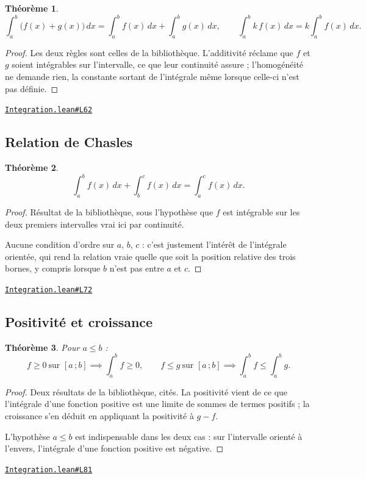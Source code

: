 \documentclass[11pt,a4paper]{article}
\theoremstyle{definition}
\theoremstyle{plain}
\newtheorem{theoreme}{Théorème}
\newcommand{\source}[2]{\par\smallskip\noindent\hfill{\footnotesize\href{#1}{\texttt{#2}}}\par\smallskip}
\begin{document}
\begin{theoreme}
\[ \int_a^b \bigl(f(x) + g(x)\bigr)\,dx = \int_a^b f(x)\,dx + \int_a^b g(x)\,dx ,
   \qquad \int_a^b k\,f(x)\,dx = k \int_a^b f(x)\,dx . \]
\end{theoreme}

\begin{proof}
Les deux règles sont celles de la bibliothèque. L'additivité réclame que $f$ et $g$ soient
intégrables sur l'intervalle, ce que leur continuité assure ; l'homogénéité ne demande
rien, la constante sortant de l'intégrale même lorsque celle-ci n'est pas définie.
\end{proof}
\source{https://github.com/Commutator-IO/learn-lean/blob/main/cours/02-lycee/06-integration/Integration.lean\#L62}{Integration.lean\#L62}

\subsection{Relation de Chasles}

\begin{theoreme}
\[ \int_a^b f(x)\,dx + \int_b^c f(x)\,dx = \int_a^c f(x)\,dx . \]
\end{theoreme}

\begin{proof}
Résultat de la bibliothèque, sous l'hypothèse que $f$ est intégrable sur les deux
premiers intervalles \textemdash{} vrai ici par continuité.

\medskip\noindent
Aucune condition d'ordre sur $a$, $b$, $c$ : c'est justement l'intérêt de l'intégrale
orientée, qui rend la relation vraie quelle que soit la position relative des trois
bornes, y compris lorsque $b$ n'est pas entre $a$ et $c$.
\end{proof}
\source{https://github.com/Commutator-IO/learn-lean/blob/main/cours/02-lycee/06-integration/Integration.lean\#L72}{Integration.lean\#L72}

\subsection{Positivité et croissance}

\begin{theoreme}
Pour $a \le b$ :
\[ f \ge 0 \ \text{sur } [a\,;b] \implies \int_a^b f \ge 0 , \qquad
   f \le g \ \text{sur } [a\,;b] \implies \int_a^b f \le \int_a^b g . \]
\end{theoreme}

\begin{proof}
Deux résultats de la bibliothèque, cités. La positivité vient de ce que l'intégrale d'une
fonction positive est une limite de sommes de termes positifs ; la croissance s'en déduit
en appliquant la positivité à $g - f$.

\medskip\noindent
L'hypothèse $a \le b$ est indispensable dans les deux cas : sur l'intervalle orienté à
l'envers, l'intégrale d'une fonction positive est négative.
\end{proof}
\source{https://github.com/Commutator-IO/learn-lean/blob/main/cours/02-lycee/06-integration/Integration.lean\#L81}{Integration.lean\#L81}
\end{document}
